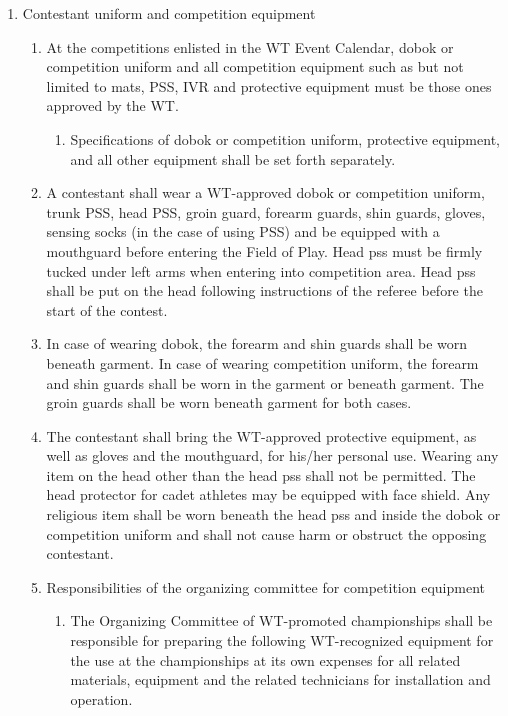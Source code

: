 \documentclass[
]{report}
\providecommand{\tightlist}{%
  \setlength{\itemsep}{0pt}\setlength{\parskip}{0pt}}
\renewcommand{\labelenumi}{\arabic{enumi}}
\begin{document}
\begin{enumerate}
\def\labelenumi{\arabic{enumi}.}
\setcounter{enumi}{1}
\item
  Contestant uniform and competition equipment

  \begin{enumerate}
  \item
    At the competitions enlisted in the WT Event Calendar, dobok or
    competition uniform and all competition equipment such as but not
    limited to mats, PSS, IVR and protective equipment must be those
    ones approved by the WT.

    \begin{enumerate}
    \tightlist
    \item
      Specifications of dobok or competition uniform, protective
      equipment, and all other equipment shall be set forth separately.
    \end{enumerate}
  \item
    A contestant shall wear a WT-approved dobok or competition uniform,
    trunk PSS, head PSS, groin guard, forearm guards, shin guards,
    gloves, sensing socks (in the case of using PSS) and be equipped
    with a mouthguard before entering the Field of Play. Head pss must
    be firmly tucked under left arms when entering into competition
    area. Head pss shall be put on the head following instructions of
    the referee before the start of the contest.
  \item
    In case of wearing dobok, the forearm and shin guards shall be worn
    beneath garment. In case of wearing competition uniform, the forearm
    and shin guards shall be worn in the garment or beneath garment. The
    groin guards shall be worn beneath garment for both cases.
  \item
    The contestant shall bring the WT-approved protective equipment, as
    well as gloves and the mouthguard, for his/her personal use. Wearing
    any item on the head other than the head pss shall not be permitted.
    The head protector for cadet athletes may be equipped with face
    shield. Any religious item shall be worn beneath the head pss and
    inside the dobok or competition uniform and shall not cause harm or
    obstruct the opposing contestant.
  \item
    Responsibilities of the organizing committee for competition
    equipment

    \begin{enumerate}
    \item
      The Organizing Committee of WT-promoted championships shall be
      responsible for preparing the following WT-recognized equipment
      for the use at the championships at its own expenses for all
      related materials, equipment and the related technicians for
      installation and operation.


\end{enumerate}
\end{enumerate}
\end{enumerate}
\end{document}
